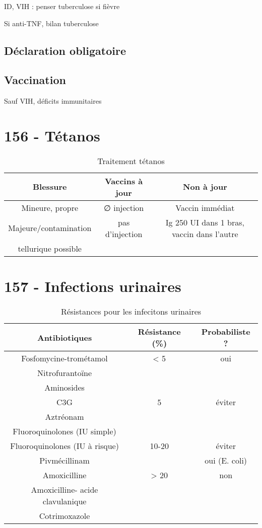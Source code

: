 ID, VIH : penser tuberculose si fièvre

Si anti-TNF, bilan tuberculose
\subsection{Déclaration obligatoire}

\subsection{Vaccination}
Sauf VIH, déficits immunitaires

\section{156 - Tétanos}
\begin{table}[htpb]
  \centering
  \caption{Traitement tétanos}
  \begin{tabular}{ccc}
    \toprule
    Blessure& Vaccins à jour& Non à jour\\
    \midrule
    Mineure, propre& ∅ injection& Vaccin immédiat\\
    Majeure/contamination& pas d'injection& Ig 250 UI dans 1
    bras, vaccin dans l'autre\\
    tellurique possible&&\\
    \bottomrule
  \end{tabular}
\end{table}

\section{157 - Infections urinaires}%
\label{sec:item_157_infections_urinaires}

\begin{table}[htpb]
  \centering
  \caption{Résistances pour les infecitons urinaires}
  \begin{tabular}{ccc}
    \toprule
    Antibiotiques & Résistance (\%) & Probabiliste ? \\
    \midrule
    Fosfomycine-trométamol & < 5 & oui \\
    Nitrofurantoïne & &\\
    Aminosides & &\\
    \midrule
    C3G & 5 & éviter \\
    Aztréonam&&\\
    Fluoroquinolones (IU simple)&&\\
    \midrule
    Fluoroquinolones (IU à risque)& 10-20& éviter\\
    Pivmécillinam & & oui (E. coli) \\
    \midrule
    Amoxicilline & > 20 & non\\
    Amoxicilline- acide clavulanique &\\
    Cotrimoxazole &\\
    \bottomrule
  \end{tabular}
\end{table}

